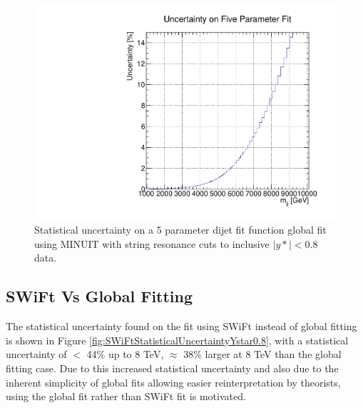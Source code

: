 \begin{figure}
    \centering
    \includegraphics[width=1\linewidth]{figures/app-GlobalFitStudies/5ParamGlobalFit_ystar0p8_Uncertainty_MINUIT.pdf}
    \caption{Statistical uncertainty on a 5 parameter dijet fit function global fit using MINUIT with string resonance cuts to inclusive $|y*|<0.8$ data.}
    \label{fig:5ParamMINUITComparison}
\end{figure}


\subsection{SWiFt Vs Global Fitting}
\label{subsec:SWiFtVsGlobal:GlobalFitting}

The statistical uncertainty found on the fit using SWiFt instead of global fitting is shown in Figure \ref{fig:SWiFtStatisticalUncertaintyYstar0.8}, with a statistical uncertainty of $ < $ 44\% up to 8 TeV, $\approx$ 38\% larger at 8 TeV than the global fitting case. Due to this increased statistical uncertainty and also due to the inherent simplicity of global fits allowing easier reinterpretation by theorists, using the global fit rather than SWiFt fit is motivated.

